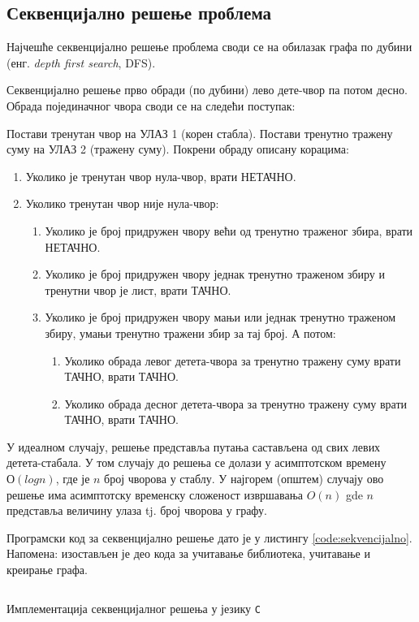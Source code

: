 \subsection{Секвенцијално решење проблема}

Најчешће секвенцијално решење проблема своди се на обилазак графа по дубини (енг. \textit{depth first search}, DFS).

Секвенцијално решење прво обради (по дубини) лево дете-чвор па потом десно.
Обрада појединачног чвора своди се на следећи поступак:

Постави тренутан чвор на УЛАЗ 1 (корен стабла). Постави тренутно тражену суму на УЛАЗ 2 (тражену суму).
Покрени обраду описану корацима:

\begin{enumerate}
    \item Уколико је тренутан чвор нула-чвор, врати НЕТАЧНО.
    \item Уколико тренутан чвор није нула-чвор:
    \begin{enumerate}
        \item Уколико је број придружен чвору већи од тренутно траженог збира, врати НЕТАЧНО.
        \item Уколико је број придружен чвору једнак тренутно траженом збиру и тренутни чвор је лист, врати ТАЧНО.
        \item Уколико је број придружен чвору мањи или једнак тренутно траженом збиру, умањи тренутно тражени збир за тај број. А потом:
        \begin{enumerate}
            \item Уколико обрада левог детета-чвора за тренутно тражену суму врати ТАЧНО, врати ТАЧНО.
            \item Уколико обрада десног детета-чвора за тренутно тражену суму врати ТАЧНО, врати ТАЧНО.
        \end{enumerate}
    \end{enumerate}
\end{enumerate}

У идеалном случају, решење представља путања састављена од свих левих детета-стабала. У том случају до решења се долази у асимптотском времену $О(log n)$,
где је $n$ број чворова у стаблу.
У најгорем (општем) случају ово решење има асимптотску временску сложеност извршавања $O(n)$ gde $n$ представља величину улаза tj. број чворова у графу.

Програмски код за секвенцијално решење дато је у листингу \ref{code:sekvencijalno}. Напомена: изостављен је део кода за учитавање библиотека, учитавање и креирање графа.

\begin{listing}
\inputminted{c}{kodovi/basic.c}
\caption{Имплементација секвенцијалног решења у језику \texttt{C}}
\label{code:sekvencijalno}
\end{listing}

\pagebreak
